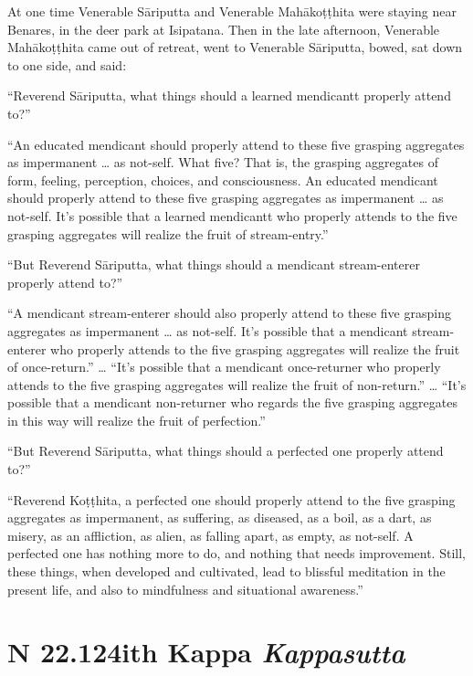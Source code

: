 \documentclass[12pt,openany]{book}%
\newcommand*{\suttatitleacronym}[1]{\smaller[2]{#1}\vspace*{.3em}}
\newcommand*{\suttatitletranslation}[1]{\linebreak{#1}}
\newcommand*{\suttatitleroot}[1]{\linebreak\smaller[2]\itshape{#1}}
\newcommand*{\tocacronym}[1]{\hspace*{-3.3em}{#1}\quad}
\newcommand*{\toctranslation}[1]{#1}
\newcommand*{\tocroot}[1]{(\textit{#1})}
\begin{document}
At one time Venerable \textsanskrit{Sāriputta} and Venerable \textsanskrit{Mahākoṭṭhita} were staying near Benares, in the deer park at Isipatana. Then in the late afternoon, Venerable \textsanskrit{Mahākoṭṭhita} came out of retreat, went to Venerable \textsanskrit{Sāriputta}, bowed, sat down to one side, and said: 

“Reverend \textsanskrit{Sāriputta}, what things should a learned mendicantt properly attend to?” 

“An educated mendicant should properly attend to these five grasping aggregates as impermanent … as not-self. What five? That is, the grasping aggregates of form, feeling, perception, choices, and consciousness. An educated mendicant should properly attend to these five grasping aggregates as impermanent … as not-self. It’s possible that a learned mendicantt who properly attends to the five grasping aggregates will realize the fruit of stream-entry.” 

“But Reverend \textsanskrit{Sāriputta}, what things should a mendicant stream-enterer properly attend to?” 

“A mendicant stream-enterer should also properly attend to these five grasping aggregates as impermanent … as not-self. It’s possible that a mendicant stream-enterer who properly attends to the five grasping aggregates will realize the fruit of once-return.” … “It’s possible that a mendicant once-returner who properly attends to the five grasping aggregates will realize the fruit of non-return.” … “It’s possible that a mendicant non-returner who regards the five grasping aggregates in this way will realize the fruit of perfection.” 

“But Reverend \textsanskrit{Sāriputta}, what things should a perfected one properly attend to?” 

“Reverend \textsanskrit{Koṭṭhita}, a perfected one should properly attend to the five grasping aggregates as impermanent, as suffering, as diseased, as a boil, as a dart, as misery, as an affliction, as alien, as falling apart, as empty, as not-self. A perfected one has nothing more to do, and nothing that needs improvement. Still, these things, when developed and cultivated, lead to blissful meditation in the present life, and also to mindfulness and situational awareness.” 

%
\section*{{\suttatitleacronym SN 22.124}{\suttatitletranslation With Kappa }{\suttatitleroot Kappasutta}}
\addcontentsline{toc}{section}{\tocacronym{SN 22.124} \toctranslation{With Kappa } \tocroot{Kappasutta}}
\end{document}
